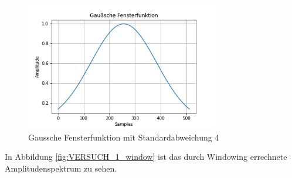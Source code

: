 \documentclass[12pt, oneside, a4paper, \docLanguage]{report}
\begin{document}
\begin{figure}[H]
	\centering\small
	\includegraphics[width=0.75\textwidth]{media/Gauss.png}
	\caption{Gaussche Fensterfunktion mit Standardabweichung 4}
	\label{fig:VERSUCH_1_gauss}
\end{figure}

In Abbildung \ref{fig:VERSUCH_1_window} ist das durch Windowing errechnete Amplitudenspektrum zu sehen.
\end{document}
